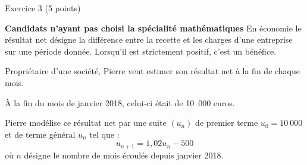 
        \begin{h2}Exercice 3 (5 points)\end{h2}
          \textbf{Candidats n'ayant pas choisi la spécialité \og mathématiques \fg{}}
         \medbreak
          En économie le résultat net désigne la différence entre la recette et les charges d'une entreprise sur une période donnée. Lorsqu'il est strictement positif, c'est un bénéfice.
          \par
          Propriétaire d'une société, Pierre veut estimer son résultat net à la fin de chaque mois.
          \par
          À la fin du mois de janvier 2018, celui-ci était de 10~000 euros.
          \par
          Pierre modélise ce résultat net par une suite $\left(u_n\right)$ de premier terme $u_0 = 10~000$ et de terme général $u_n$ tel que :
          \[u_{n+1} = 1,02u_n - 500\]
           où $n$ désigne le nombre de mois écoulés depuis janvier 2018.
          \medbreak
